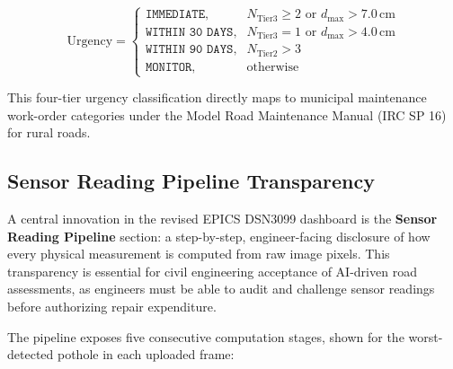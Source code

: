 \begin{equation}
    \text{Urgency} = 
    \begin{cases}
        \texttt{IMMEDIATE}, & N_{\text{Tier3}} \ge 2 \text{ or } d_{\max} > 7.0\,\text{cm} \\
        \texttt{WITHIN 30 DAYS}, & N_{\text{Tier3}} = 1 \text{ or } d_{\max} > 4.0\,\text{cm} \\
        \texttt{WITHIN 90 DAYS}, & N_{\text{Tier2}} > 3 \\
        \texttt{MONITOR}, & \text{otherwise}
    \end{cases}
    \label{eq:urgency_logic}
\end{equation}

This four-tier urgency classification directly maps to municipal maintenance work-order categories under the Model Road Maintenance Manual (IRC SP 16) for rural roads.

\subsection{Sensor Reading Pipeline Transparency}

A central innovation in the revised EPICS DSN3099 dashboard is the \textbf{Sensor Reading Pipeline} section: a step-by-step, engineer-facing disclosure of how every physical measurement is computed from raw image pixels. This transparency is essential for civil engineering acceptance of AI-driven road assessments, as engineers must be able to audit and challenge sensor readings before authorizing repair expenditure.

The pipeline exposes five consecutive computation stages, shown for the worst-detected pothole in each uploaded frame:

